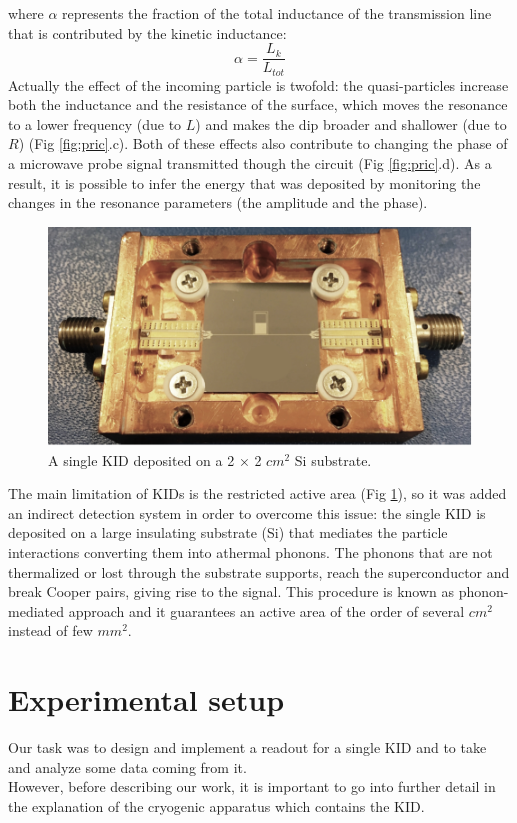 \documentclass[12pt]{article}
\begin{document}
where $\alpha$ represents the fraction of the total inductance of the transmission line that is contributed by the kinetic inductance:
\begin{equation}
    \alpha = \frac{L_{k}}{L_{tot}}
\end{equation}
Actually the effect of the incoming particle is twofold: the quasi-particles increase both the inductance and the resistance of the surface, which moves the resonance to a lower frequency (due to $L$) and makes the dip broader and shallower (due to $R$) (Fig \ref{fig:pric}.c). Both of these effects also contribute to changing the phase of a microwave probe signal transmitted though the circuit (Fig \ref{fig:pric}.d). As a result, it is possible to infer the energy that was deposited by monitoring the changes in the resonance parameters (the amplitude and the phase).\\
\begin{figure}[H] 
        \centering \includegraphics[width=0.9\columnwidth]{KID.png}
        \caption{
                \label{fig:KID} A single KID deposited on a 2 × 2 $cm^2$ Si substrate.
        }
\end{figure}

The main limitation of KIDs is the restricted active area (Fig \ref{fig:KID}), so it was added an indirect detection system in order to overcome this issue: the single KID is deposited on a large insulating substrate (Si) that mediates the particle interactions converting them into athermal phonons. The phonons that are not thermalized or lost through the substrate supports, reach the superconductor and break Cooper pairs, giving rise to the signal. This procedure is known as phonon-mediated approach and it guarantees an active area of the order of several $cm^2$ instead of few $mm^2$.
\section{Experimental setup}
Our task was to design and implement a readout for a single KID and to take and analyze some data coming from it.\\
However, before describing our work, it is important to go into further detail in the explanation of the cryogenic apparatus which contains the KID.
\end{document}
